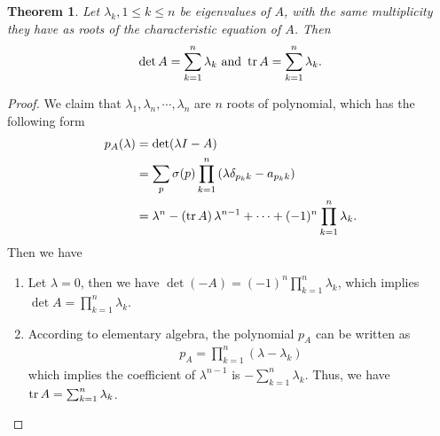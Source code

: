 \documentclass[11pt]{book}
\newtheorem{theorem}{Theorem}[section]
\theoremstyle{definition}
\numberwithin{equation}{subsection}
\begin{document}
\medskip

\begin{theorem}
Let $\lambda_k,1\leq k\leq n$ be eigenvalues of $A$, with the same multiplicity they have as roots of the characteristic equation of $A$. Then 
\begin{align*}
    \det A = \sum^n_{k=1}\lambda_k \,\,\text{and}\,\, \tr A = \sum^n_{k=1}\lambda_k.
\end{align*}
\end{theorem}
\begin{proof}
We claim that $\lambda_1,\lambda_n,\cdots,\lambda_n$ are $n$ roots of polynomial, which has the following form
\begin{align*}
    p_A(\lambda) & = \det (\lambda I - A) \\
    & = \sum_p \sigma(p) \prod^n_{k=1} \left(\lambda \delta_{p_k k} - a_{p_k k}\right) \\
    & = \lambda^n - \left(\tr A \right)\lambda^{n-1} +\cdots + (-1)^n \prod^n_{k=1}\lambda_k.
\end{align*}
Then we have
\begin{enumerate}[label=(\arabic*)]
    \item Let $\lambda = 0$, then we have $\det (-A) = (-1)^n \prod^n_{k=1}\lambda_k$, which implies $\det A = \prod^n_{k=1}\lambda_k$.
    \item According to elementary algebra, the polynomial $p_A$ can be written as 
    \begin{align*}
        p_A = \prod^n_{k=1} (\lambda - \lambda_k)
    \end{align*}
    which implies the coefficient of $\lambda^{n-1}$ is $ - \sum^n_{k=1}\lambda_k$. Thus, we have $\tr A = \sum^n_{k=1}\lambda_k$.
\end{enumerate}
\end{proof}

\medskip
\end{document}
